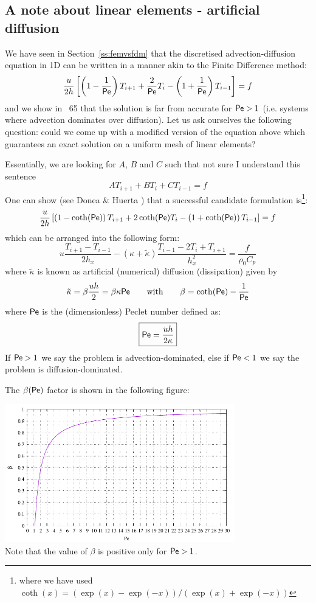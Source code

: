 \subsection{A note about linear elements - artificial diffusion}

We have seen in Section~\ref{ss:femvsfdm} that the discretised advection-diffusion equation 
in 1D can be written in a manner akin to the Finite Difference method:
\[
\frac{u}{2h}
\left[
\left(1-\frac{1}{{\mathsf{Pe}}}\right) T_{i+1} + \frac{2}{{\mathsf{Pe}}} T_i - \left(1+\frac{1}{{\mathsf{Pe}}}\right)T_{i-1} 
\right] = f
\]
and we show in \stone~65 that the solution is far from accurate for ${\mathsf{Pe}}>1$ (i.e. systems where advection 
dominates over diffusion). Let us ask ourselves the 
following question: could we come up with a modified version of the equation above which 
guarantees an exact solution on a uniform mesh of linear elements?

Essentially, we are looking for $A$, $B$ and $C$ such that 
{\color{red} not sure I understand this sentence} 
\[
A T_{i+1} + BT_i + C T_{i-1} = f
\]
One can show (see Donea \& Huerta \cite{dohu03}) that a successful 
candidate formulation is\footnote{where we have used $\coth(x)=(\exp(x)-\exp(-x))/(\exp(x)+\exp(-x))$}:
\[
\frac{u}{2h}
\left[
\left(1-\coth({\mathsf{Pe}}) \right) T_{i+1} + 2 \coth({\mathsf{Pe}}) T_i - \left(1+\coth({\mathsf{Pe}})\right) T_{i-1} 
\right] = f
\]
which can be arranged into the following form:
\begin{equation}
u
\frac{T_{i+1}-T_{i-1}}{2h_x}
-
(\kappa+ \tilde{\kappa})
\frac{T_{i-1}-2T_i+T_{i+1}}{h_x^2}
= \frac{f}{\rho_0 C_p}
\end{equation}
where 
$\tilde{\kappa}$ is known as artificial (numerical) diffusion (dissipation) given by
\[
\tilde{\kappa}=\beta \frac{u h}{2} = \beta \kappa {\mathsf{Pe}}
\qquad
\text{with}
\qquad
\beta = \coth ({\mathsf{Pe}}) - \frac{1}{{\mathsf{Pe}}}
\]
where ${\mathsf{Pe}}$ is the (dimensionless) Peclet number defined as: 
\[
\boxed{
{\mathsf{Pe}}= \frac{u h }{2 \kappa}
}
\]
If ${\mathsf{Pe}}>1$ we say the problem is advection-dominated, 
else if ${\mathsf{Pe}}<1$ we say the problem is diffusion-dominated.

The $\beta({\mathsf{Pe}})$ factor is shown in the following figure:
\begin{center}
\includegraphics[width=10cm]{images/supg/beta}\\
{\captionfont Note that the value of $\beta$ is positive only for ${\mathsf{Pe}}>1$.}
\end{center}


